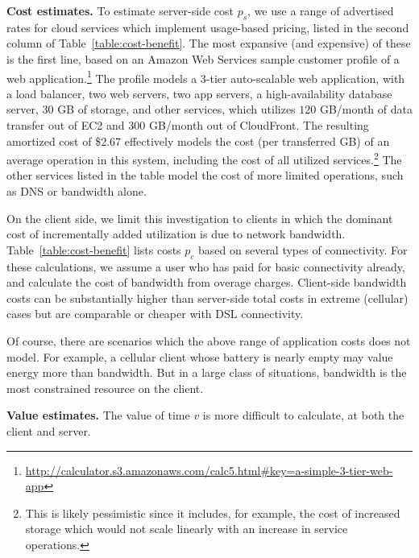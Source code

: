 \documentclass{sigcomm-alternate}
\newcommand{\parheading}[1]{\medskip{} \noindent \textbf{#1}}
\begin{document}
\parheading{Cost estimates.}  To estimate server-side cost $p_s$, we use a range of advertised rates for cloud services which implement usage-based pricing, listed in the second column of Table~\ref{table:cost-benefit}. The most expansive (and expensive) of these is the first line, based on an Amazon Web Services sample customer profile of a web application.\footnote{\url{http://calculator.s3.amazonaws.com/calc5.html#key=a-simple-3-tier-web-app}}  The profile models a 3-tier auto-scalable web application, with a load balancer, two web servers, two app servers, a high-availability database server, 30 GB of storage, and other services, which utilizes $120$ GB/month of data transfer out of EC2 and $300$ GB/month out of CloudFront.  The resulting amortized cost of \$$2.67$ effectively models the cost (per transferred GB) of an average operation in this system, including the cost of all utilized services.\footnote{This is likely pessimistic since it includes, for example, the cost of increased storage which would not scale linearly with an increase in service operations.}  The other services listed in the table model the cost of more limited operations, such as DNS or bandwidth alone.

On the client side, we limit this investigation to clients in which the dominant cost of incrementally added utilization is due to network bandwidth.  Table~\ref{table:cost-benefit} lists costs $p_c$ based on several types of connectivity. For these calculations, we assume a user who has paid for basic connectivity already, and calculate the cost of bandwidth from overage charges. Client-side bandwidth costs can be substantially higher than server-side total costs in extreme (cellular) cases but are comparable or cheaper with DSL connectivity.

Of course, there are scenarios which the above range of application costs does not model. For example, a cellular client whose battery is nearly empty may value energy more than bandwidth.  But in a large class of situations, bandwidth is the most constrained resource on the client.




\parheading{Value estimates.} The value of time $v$ is more difficult to calculate, at both the client and server.
\end{document}

